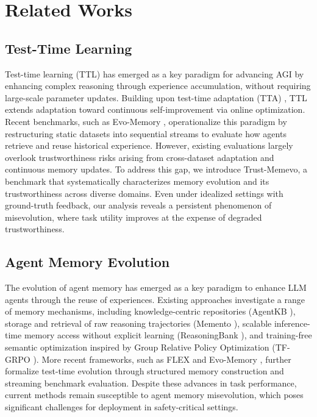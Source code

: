 \documentclass{article}
\theoremstyle{plain}
\theoremstyle{definition}
\theoremstyle{remark}
\begin{document}
\section{Related Works}

\subsection{Test-Time Learning}
Test-time learning (TTL) has emerged as a key paradigm for advancing AGI by enhancing complex reasoning through experience accumulation, without requiring large-scale parameter updates. Building upon test-time adaptation (TTA) \cite{seto2024realm,NEURIPS2022_fc28053a,wang2021tent}, TTL extends adaptation toward continuous self-improvement via online optimization. Recent benchmarks, such as Evo-Memory \cite{wei2025evo}, operationalize this paradigm by restructuring static datasets into sequential streams to evaluate how agents retrieve and reuse historical experience. However, existing evaluations largely overlook trustworthiness risks arising from cross-dataset adaptation and continuous memory updates. To address this gap, we introduce Trust-Memevo, a benchmark that systematically characterizes memory evolution and its trustworthiness across diverse domains. Even under idealized settings with ground-truth feedback, our analysis reveals a persistent phenomenon of misevolution, where task utility improves at the expense of degraded trustworthiness.

\subsection{Agent Memory Evolution}

The evolution of agent memory \cite{anonymous2026memgen,wang2026explore} has emerged as a key paradigm to enhance LLM agents through the reuse of experiences. Existing approaches investigate a range of memory mechanisms, including knowledge-centric repositories (AgentKB \cite{tang2025agent}), storage and retrieval of raw reasoning trajectories (Memento \cite{zhou2025memento}), scalable inference-time memory access without explicit learning (ReasoningBank \cite{anonymous2026reasoningbank}), and training-free semantic optimization inspired by Group Relative Policy Optimization (TF-GRPO \cite{cai2025training}). More recent frameworks, such as FLEX \cite{cai2025flex} and Evo-Memory \cite{wei2025evo}, further formalize test-time evolution through structured memory construction and streaming benchmark evaluation. Despite these advances in task performance, current methods remain susceptible to agent memory misevolution, which poses significant challenges for deployment in safety-critical settings.
\end{document}

